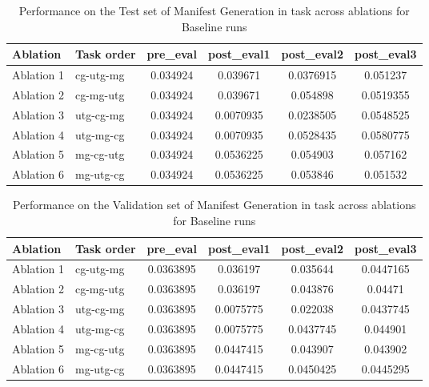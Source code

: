 \begin{table}[!ht]
    \centering
    \caption{Performance on the Test set of Manifest Generation in task across ablations for Baseline runs}
    \begin{tabular}{|l|l|S[table-format=2.4]|S[table-format=2.4]|S[table-format=2.4]|S[table-format=2.4]|}
    \hline
        \textbf{Ablation} & \textbf{Task order} & \textbf{pre\_eval} & \textbf{post\_eval1} & \textbf{post\_eval2} & \textbf{post\_eval3 } \\ \hline
        Ablation 1 & cg-utg-mg & 0.034924 & 0.039671 & 0.0376915 & 0.051237  \\ 
        Ablation 2 & cg-mg-utg & 0.034924 & 0.039671 & 0.054898 & 0.0519355  \\ 
        Ablation 3 & utg-cg-mg & 0.034924 & 0.0070935 & 0.0238505 & 0.0548525  \\ 
        Ablation 4 & utg-mg-cg & 0.034924 & 0.0070935 & 0.0528435 & 0.0580775  \\ 
        Ablation 5 & mg-cg-utg & 0.034924 & 0.0536225 & 0.054903 & 0.057162  \\ 
        Ablation 6 & mg-utg-cg & 0.034924 & 0.0536225 & 0.053846 & 0.051532 \\ \hline
    \end{tabular}
    \label{tab:ManifestGenTestBaseline}
\end{table}

\begin{table}[!ht]
    \centering
    \caption{Performance on the Validation set of Manifest Generation in task across ablations for Baseline runs}
    \begin{tabular}{|l|l|S[table-format=2.4]|S[table-format=2.4]|S[table-format=2.4]|S[table-format=2.4]|}
    \hline
        \textbf{Ablation} & \textbf{Task order} & \textbf{pre\_eval} & \textbf{post\_eval1} & \textbf{post\_eval2} & \textbf{post\_eval3 } \\ \hline
        Ablation 1 & cg-utg-mg & 0.0363895 & 0.036197 & 0.035644 & 0.0447165  \\ 
        Ablation 2 & cg-mg-utg & 0.0363895 & 0.036197 & 0.043876 & 0.04471  \\ 
        Ablation 3 & utg-cg-mg & 0.0363895 & 0.0075775 & 0.022038 & 0.0437745  \\ 
        Ablation 4 & utg-mg-cg & 0.0363895 & 0.0075775 & 0.0437745 & 0.044901  \\ 
        Ablation 5 & mg-cg-utg & 0.0363895 & 0.0447415 & 0.043907 & 0.043902  \\ 
        Ablation 6 & mg-utg-cg & 0.0363895 & 0.0447415 & 0.0450425 & 0.0445295 \\ \hline
    \end{tabular}
    \label{tab:ManifestGenValBaseline}
\end{table}